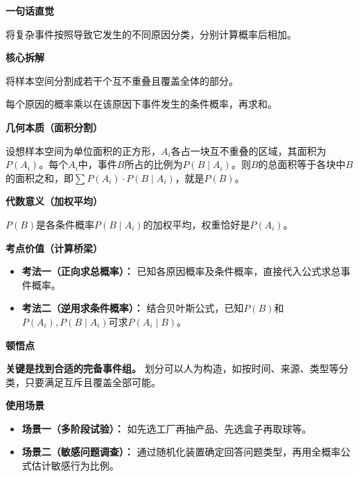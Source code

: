 \begin{explanationbox}

	\textbf{\textcolor{CExplanation}{一句话直觉}}

	将复杂事件按照导致它发生的不同原因分类，分别计算概率后相加。

	\medskip
	\textbf{\textcolor{CExplanation}{核心拆解}}
	\begin{description}[style=nextline, leftmargin=2.8em, labelsep=0.5em, itemsep=0.45em]
		\item[\textbf{要点一（划分思想）：}] 将样本空间分割成若干个互不重叠且覆盖全体的部分。
		\item[\textbf{要点二（加权求和）：}] 每个原因的概率乘以在该原因下事件发生的条件概率，再求和。
	\end{description}

	\medskip
	\textbf{\textcolor{CExplanation}{几何本质（面积分割）}}

	设想样本空间为单位面积的正方形，$A_i$各占一块互不重叠的区域，其面积为$P(A_i)$。每个$A_i$中，事件$B$所占的比例为$P(B\mid A_i)$。则$B$的总面积等于各块中$B$的面积之和，即$\sum P(A_i)\cdot P(B\mid A_i)$，就是$P(B)$。

	\medskip
	\textbf{\textcolor{CExplanation}{代数意义（加权平均）}}

	$P(B)$是各条件概率$P(B\mid A_i)$的加权平均，权重恰好是$P(A_i)$。

	\medskip
	\textbf{\textcolor{CExplanation}{考点价值（计算桥梁）}}
	\begin{itemize}[leftmargin=*, itemsep=0.5em, topsep=0.4em]
		\item \textbf{考法一（正向求总概率）：} 已知各原因概率及条件概率，直接代入公式求总事件概率。
		\item \textbf{考法二（逆用求条件概率）：} 结合贝叶斯公式，已知$P(B)$和$P(A_i),P(B\mid A_i)$可求$P(A_i\mid B)$。
	\end{itemize}

	\medskip
	\textbf{\textcolor{CExplanation}{顿悟点}}

	\textbf{关键是找到合适的完备事件组。} 划分可以人为构造，如按时间、来源、类型等分类，只要满足互斥且覆盖全部可能。

	\medskip
	\textbf{\textcolor{CExplanation}{使用场景}}
	\begin{itemize}[leftmargin=*, itemsep=0.5em, topsep=0.4em]
		\item \textbf{场景一（多阶段试验）：} 如先选工厂再抽产品、先选盒子再取球等。
		\item \textbf{场景二（敏感问题调查）：} 通过随机化装置确定回答问题类型，再用全概率公式估计敏感行为比例。
	\end{itemize}
\end{explanationbox}
